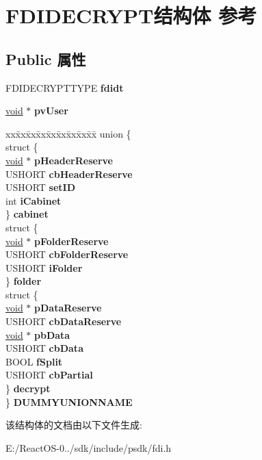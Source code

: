\hypertarget{struct_f_d_i_d_e_c_r_y_p_t}{}\section{F\+D\+I\+D\+E\+C\+R\+Y\+P\+T结构体 参考}
\label{struct_f_d_i_d_e_c_r_y_p_t}
\subsection*{Public 属性}
\begin{DoxyCompactItemize}
\item 
\mbox{\label{struct_f_d_i_d_e_c_r_y_p_t_a476884f21879eaa051c3d3a841fa7e32}} 
F\+D\+I\+D\+E\+C\+R\+Y\+P\+T\+T\+Y\+PE {\bfseries fdidt}
\item 
\mbox{\label{struct_f_d_i_d_e_c_r_y_p_t_a922c09ceda40cd1a703ac857ab8b8ba6}} 
\hyperlink{interfacevoid}{void} $\ast$ {\bfseries pv\+User}
\item 
\mbox{\label{struct_f_d_i_d_e_c_r_y_p_t_ae5c1c606179ca1ac35f45247b4692858}} 
\begin{tabbing}
xx\=xx\=xx\=xx\=xx\=xx\=xx\=xx\=xx\=\kill
union \{\\
\>struct \{\\
\>\>\hyperlink{interfacevoid}{void} $\ast$ {\bfseries pHeaderReserve}\\
\>\>USHORT {\bfseries cbHeaderReserve}\\
\>\>USHORT {\bfseries setID}\\
\>\>int {\bfseries iCabinet}\\
\>\} {\bfseries cabinet}\\
\>struct \{\\
\>\>\hyperlink{interfacevoid}{void} $\ast$ {\bfseries pFolderReserve}\\
\>\>USHORT {\bfseries cbFolderReserve}\\
\>\>USHORT {\bfseries iFolder}\\
\>\} {\bfseries folder}\\
\>struct \{\\
\>\>\hyperlink{interfacevoid}{void} $\ast$ {\bfseries pDataReserve}\\
\>\>USHORT {\bfseries cbDataReserve}\\
\>\>\hyperlink{interfacevoid}{void} $\ast$ {\bfseries pbData}\\
\>\>USHORT {\bfseries cbData}\\
\>\>BOOL {\bfseries fSplit}\\
\>\>USHORT {\bfseries cbPartial}\\
\>\} {\bfseries decrypt}\\
\} {\bfseries DUMMYUNIONNAME}\\

\end{tabbing}\end{DoxyCompactItemize}


该结构体的文档由以下文件生成\+:\begin{DoxyCompactItemize}
\item 
E\+:/\+React\+O\+S-\/0../sdk/include/psdk/fdi.\+h\end{DoxyCompactItemize}
